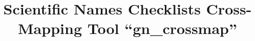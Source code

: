\documentclass{bmcart}
\begin{document}
\begin{frontmatter}

\begin{fmbox}


\title{Scientific Names Checklists Cross-Mapping Tool
  ``gn\_crossmap''}



\author[
   addressref={aff1},
   corref={aff1},
   email={mozzheri@illinois.edu}
]{ }
\author[
   addressref={aff2},
   email={wouter.addink@naturalis.nl}
]{ }
\author[
   addressref={aff3},
   email={rui.figueira@iict.pt}
]{ }
\author[
   addressref={aff4},
   email={wouter.koch@artsdatabanken.no}
]{ }
\author[
   addressref={aff4},
   email={toril.moen@artsdatabanken.no}
]{ }
\author[
   addressref={aff5},
   email={dremsen@mbl.edu}
]{ }



\end{fmbox}
\end{frontmatter}
\end{document}
